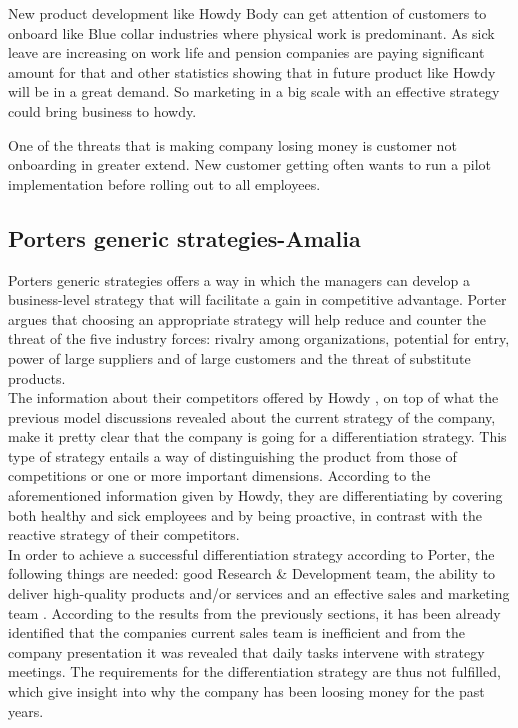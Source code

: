 \noindent New product development like Howdy Body can get attention of customers to onboard like Blue collar industries where physical work is predominant. As sick leave are increasing on work life and pension companies are paying significant amount for that and other statistics showing that in future product like Howdy will be in a great demand. So marketing in a big scale with an effective strategy could bring business to howdy.

\noindent One of the threats that is making company losing money is customer not onboarding in greater extend. New customer getting often wants to run a pilot implementation before rolling out to all employees.
\subsection{Porters generic strategies-Amalia}
Porters generic strategies offers a way in which the managers can develop a business-level strategy that will facilitate a gain in competitive advantage\cite[p.190]{jones_george_2013}. Porter argues that choosing an appropriate strategy will help reduce and counter the threat of the five industry forces: rivalry among organizations, potential for entry, power of large suppliers and of large customers and the threat of substitute products\cite[p.189-190]{jones_george_2013}.\\
\noindent The information about their competitors offered by Howdy \cite{Extrainfo}, on top of what the previous model discussions revealed about the current strategy of the company, make it pretty clear that the company is going for a differentiation strategy. This type of strategy entails a way of distinguishing the product from those of competitions or one or more important dimensions\cite[p.191]{jones_george_2013}. According to the aforementioned information given by Howdy, they are differentiating by covering both healthy and sick employees and by being proactive, in contrast with the reactive strategy of their competitors. \\
\noindent In order to achieve a successful differentiation strategy according to Porter, the following things are needed: good Research \& Development team, the ability to deliver high-quality products and/or services and an effective sales and marketing team \cite{mind_tools_porter}. According to the results from the previously sections, it has been already identified that the companies current sales team is inefficient and from the company presentation\cite[s.11]{oneofthepresentations} it was revealed that daily tasks intervene with strategy meetings. The requirements for the differentiation strategy are thus not  fulfilled, which give insight into why the company has been loosing money for the past years. 

